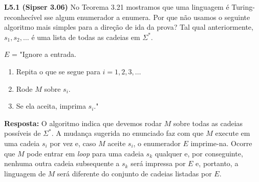 
\noindent \textbf{L5.1 (Sipser 3.06)} No Teorema 3.21 mostramos que uma linguagem é Turing-reconhecível sse algum
enumerador a enumera. Por que não usamos o seguinte algoritmo mais simples para a direção de ida da prova? Tal qual anteriormente, $s_1, s_2, \ldots $ é uma lista de todas as cadeias em $\Sigma^*$.

$E$ = "Ignore a entrada.
\begin{enumerate}[label={\textbf{\arabic*.}}, leftmargin=1.05in]
\item Repita o que se segue para $i = 1, 2, 3, \ldots$
\item Rode $M$ sobre $s_i$.
\item Se ela aceita, imprima $s_i$."
\end{enumerate}

\textbf{Resposta: } O algoritmo indica que devemos rodar $M$ sobre todas as cadeias possíveis de $\Sigma^*$. A mudança sugerida no enunciado faz com que $M$ execute em uma cadeia $s_i$ por vez e, caso $M$ aceite $s_i$, o enumerador $E$ imprime-na. Ocorre que $M$ pode entrar em \textit{loop} para uma cadeia $s_k$ qualquer e, por conseguinte, nenhuma outra cadeia subsequente a $s_k$ será impressa por $E$ e, portanto, a linguagem de $M$ será diferente do conjunto de cadeias listadas por $E$.\\[6pt]